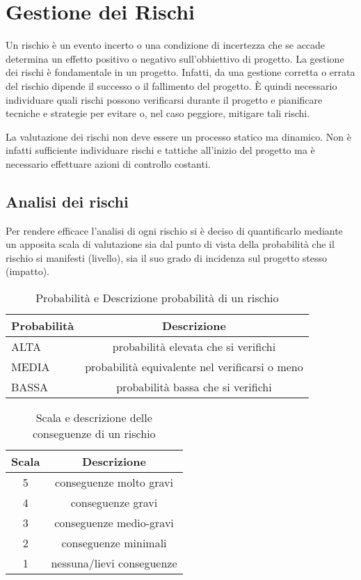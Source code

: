 	
	
	
	



\section{Gestione dei Rischi}
Un rischio è un evento incerto o una condizione di incertezza che se accade determina un effetto positivo o negativo sull'obbiettivo di progetto.
La gestione dei rischi è fondamentale in un progetto. Infatti, da una gestione corretta o errata del rischio dipende il successo o il fallimento del progetto.
È quindi necessario individuare quali rischi possono verificarsi durante il progetto e pianificare tecniche e strategie per evitare o, nel caso peggiore, mitigare tali rischi.

La valutazione dei rischi non deve essere un processo statico ma dinamico. Non è infatti sufficiente individuare rischi e tattiche all'inizio del progetto ma è necessario effettuare azioni di controllo costanti. 

\subsection{Analisi dei rischi}


Per rendere efficace l'analisi di ogni rischio si è deciso di quantificarlo mediante un apposita scala di valutazione sia dal punto di vista della probabilità che il rischio si manifesti (livello), sia il suo grado di incidenza sul progetto stesso (impatto).

\begin{table}[h!]
\centering
\begin{tabular}{|l|c|}
\hline
Probabilità& Descrizione\\
\hline
ALTA & probabilità elevata che si verifichi\\
MEDIA & probabilità equivalente nel verificarsi o meno\\
BASSA & probabilità bassa che si verifichi\\
\hline
\end{tabular}
\caption{Probabilità e Descrizione probabilità di un rischio}\label{tab:livellorischi}
\end{table}
\begin{table}[h!]
\centering
\begin{tabular}{|c|c|}
\hline
Scala& Descrizione  \\
\hline
5 & conseguenze molto gravi\\
4 & conseguenze gravi\\
3 & conseguenze medio-gravi\\
2 & conseguenze minimali\\
1 & nessuna/lievi conseguenze\\
\hline
\end{tabular}
\caption{Scala e descrizione delle conseguenze di un rischio}\label{tab:impattorischi}
\end{table}


